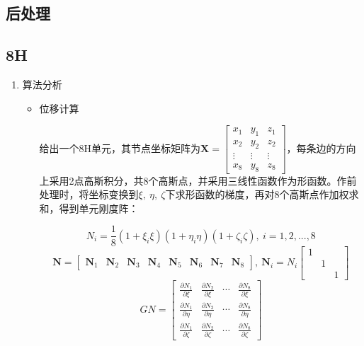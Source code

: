\documentclass[UTF8]{ctexbook}
\begin{document}
\subsection{后处理}

\subsection{8H}
\begin{itemize}
\begin{enumerate}
\item 算法分析

\begin{itemize}
\item 位移计算


给出一个8H单元，其节点坐标矩阵为$\boldsymbol{X}=\begin{bmatrix}x_{1} & y_{1} & z_{1}\\
x_{2} & y_{2} & z_{2}\\
\vdots & \vdots & \vdots\\
x_{8} & y_{8} & z_{8}
\end{bmatrix}$，每条边的方向上采用2点高斯积分，共8个高斯点，并采用三线性函数作为形函数。作前处理时，将坐标变换到$\xi,\ \eta,\ \zeta$下求形函数的梯度，再对8个高斯点作加权求和，得到单元刚度阵：


\[
N_{i}=\frac{1}{8}(1+\xi_{i}\xi)(1+\eta_{i}\eta)(1+\zeta_{i}\zeta),\ i=1,2,...,8
\]
\[
\boldsymbol{N}=\begin{bmatrix}\boldsymbol{N}_{1} & \boldsymbol{N}_{2} & \boldsymbol{N}_{3} & \boldsymbol{N}_{4} & \boldsymbol{N}_{5} & \boldsymbol{N}_{6} & \boldsymbol{N}_{7} & \boldsymbol{N}_{8}\end{bmatrix},\ \boldsymbol{N}_{i}=N_{i}\begin{bmatrix}1\\
 & 1\\
 &  & 1
\end{bmatrix}
\]
\[
GN=\begin{bmatrix}\frac{\partial N_{1}}{\partial\xi} & \frac{\partial N_{2}}{\partial\xi} & \cdots & \frac{\partial N_{8}}{\partial\xi}\\
\frac{\partial N_{1}}{\partial\eta} & \frac{\partial N_{2}}{\partial\eta} & \cdots & \frac{\partial N_{8}}{\partial\eta}\\
\frac{\partial N_{1}}{\partial\zeta} & \frac{\partial N_{2}}{\partial\zeta} & \cdots & \frac{\partial N_{8}}{\partial\zeta}
\end{bmatrix}
\]




\end{itemize}
\end{enumerate}
\end{itemize}
\end{document}
